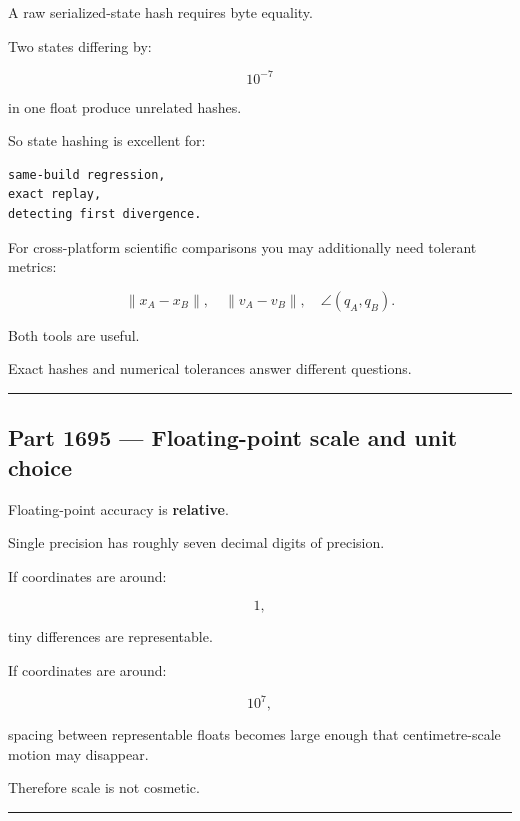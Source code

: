 \hypertarget{06-engine-ii-ch039-state-hash-is-not-proof-of-cross-platform-mathematical-equivalence}{}

A raw serialized-state hash requires byte equality.

Two states differing by:

\[
10^{-7}
\]

in one float produce unrelated hashes.

So state hashing is excellent for:

\begin{verbatim}
same-build regression,
exact replay,
detecting first divergence.
\end{verbatim}

For cross-platform scientific comparisons you may additionally need tolerant metrics:

\[
\|x_A-x_B\|,
\quad
\|v_A-v_B\|,
\quad
\angle(q_A,q_B).
\]

Both tools are useful.

Exact hashes and numerical tolerances answer different questions.

\begin{center}\rule{0.5\linewidth}{0.5pt}\end{center}

\subsection{Part 1695 --- Floating-point scale and unit choice}\label{06-engine-ii-ch039-part-1695-floating-point-scale-and-unit-choice}

\hypertarget{06-engine-ii-ch039-part-1695-floating-point-scale-and-unit-choice}{}

Floating-point accuracy is \textbf{relative}.

Single precision has roughly seven decimal digits of precision.

If coordinates are around:

\[
1,
\]

tiny differences are representable.

If coordinates are around:

\[
10^7,
\]

spacing between representable floats becomes large enough that centimetre-scale motion may disappear.

Therefore scale is not cosmetic.

\begin{center}\rule{0.5\linewidth}{0.5pt}\end{center}

